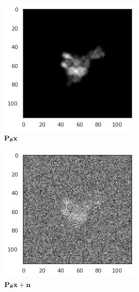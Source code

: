 \begin{figure}[ht!]
\begin{minipage}[b]{0.35\linewidth}
\begin{subfigure}[b]{0.49\linewidth}
            \includegraphics[width=0.8\linewidth]{figures/5j0n_noise0}
            \caption*{$\mathbf{P}_{{\boldsymbol{\theta}}} \mathbf{x}$}
        \end{subfigure}
        \hfill
        \begin{subfigure}[b]{0.49\linewidth}
            \centering
            \includegraphics[width=0.8\linewidth]{figures/5j0n_noise16}
            \caption*{$\mathbf{P}_{{\boldsymbol{\theta}}} \mathbf{x} + \mathbf{n}$}
        \end{subfigure}
        \\ \vspace{1em}
        \begin{subfigure}[b]{0.49\linewidth}

\end{subfigure}
\end{minipage}
\end{figure}

